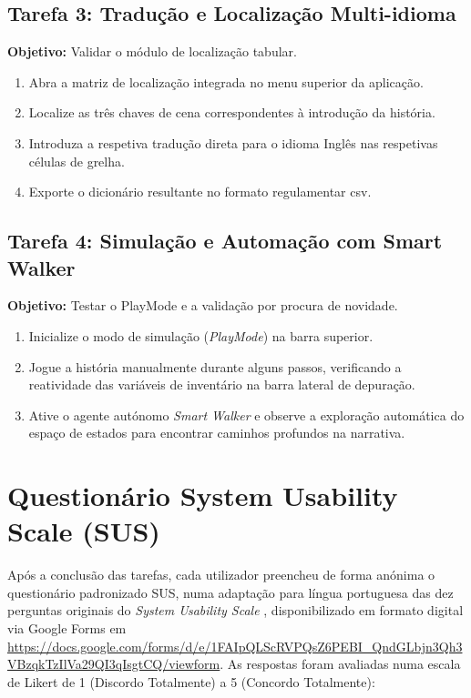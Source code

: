 \subsection*{Tarefa 3: Tradução e Localização Multi-idioma}
\textbf{Objetivo:} Validar o módulo de localização tabular.
\begin{enumerate}
    \item Abra a matriz de localização integrada no menu superior da aplicação.
    \item Localize as três chaves de cena correspondentes à introdução da história.
    \item Introduza a respetiva tradução direta para o idioma Inglês nas respetivas células de grelha.
    \item Exporte o dicionário resultante no formato regulamentar \gls{csv}.
\end{enumerate}

\subsection*{Tarefa 4: Simulação e Automação com Smart Walker}
\textbf{Objetivo:} Testar o PlayMode e a validação por procura de novidade.
\begin{enumerate}
    \item Inicialize o modo de simulação (\textit{PlayMode}) na barra superior.
    \item Jogue a história manualmente durante alguns passos, verificando a reatividade das variáveis de inventário na barra lateral de depuração.
    \item Ative o agente autónomo \textit{Smart Walker} e observe a exploração automática do espaço de estados para encontrar caminhos profundos na narrativa.
\end{enumerate}

\section{Questionário System Usability Scale (SUS)}
Após a conclusão das tarefas, cada utilizador preencheu de forma anónima o questionário padronizado SUS, numa adaptação para língua portuguesa das dez perguntas originais do \textit{System Usability Scale} \citep{Brooke1996, Martins2015}, disponibilizado em formato digital via Google Forms em \url{https://docs.google.com/forms/d/e/1FAIpQLScRVPQsZ6PEBI_QndGLbjn3Qh3VBzqkTzIlVa29QI3qIsgtCQ/viewform}. As respostas foram avaliadas numa escala de Likert de 1 (Discordo Totalmente) a 5 (Concordo Totalmente):

